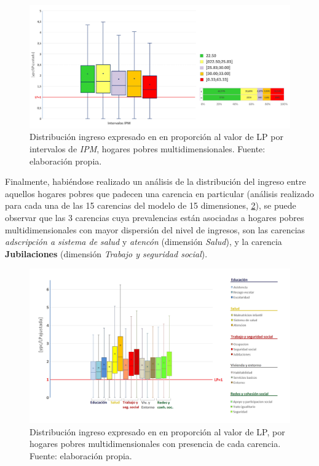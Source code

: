 \documentclass[12pt,letterpaper,spanish]{article}
\begin{document}
\begin{figure}[!]
    \centering
    \includegraphics[width=\textwidth]{Max/box_deciles2.png}
    \caption{Distribución ingreso expresado en en proporción al valor de LP por intervalos de \textit{IPM}, hogares pobres multidimensionales. Fuente: elaboración propia.}
    \label{box_deciles}
\end{figure}



Finalmente, habiéndose realizado un análisis de la distribución del ingreso entre aquellos hogares pobres que padecen una carencia en particular (análisis realizado para cada una de las 15 carencias del modelo de 15 dimensiones, \ref{box_carencias}), se puede observar que las 3 carencias cuya prevalencias están asociadas a hogares pobres multidimensionales con mayor dispersión del nivel de ingresos, son las carencias \textit{adscripción a sistema de salud} y \textit{atencón} (dimensión \textit{Salud}), y la carencia \textbf{Jubilaciones} (dimensión \textit{Trabajo y seguridad social}).



\begin{figure}[!]
    \centering
    \includegraphics[width=\textwidth]{Max/box_carencias.png}
    \caption{Distribución ingreso expresado en en proporción al valor de LP, por hogares pobres multidimensionales con presencia de cada carencia. Fuente: elaboración propia.}
    \label{box_carencias}
\end{figure}
\end{document}
